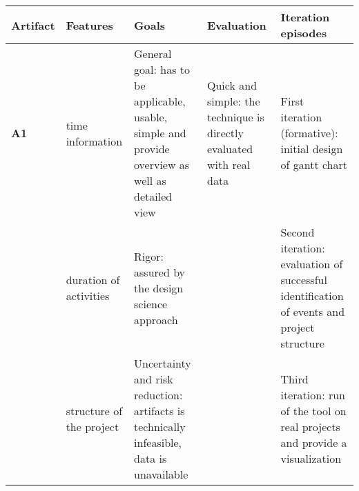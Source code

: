 \begin{longtable}[c]{@{}p{1.2cm}p{2.5cm}p{5cm}p{3cm}p{4cm}@{}}
\toprule
\textbf{Artifact} & \textbf{Features}                              & \textbf{Goals}                                                                                                                                                                                                                                                           & \textbf{Evaluation}                                                                                                                                  & \textbf{Iteration episodes}                                                                                                   \\* \midrule
\endhead
%
\bottomrule
\endfoot
%
\endlastfoot
%
\textbf{A1}       & time information                               & General goal: has to be applicable, usable, simple and provide overview as well as detailed view                                                                                                                                                                         & Quick and simple: the technique is directly evaluated with real data                                                                                 & First iteration (formative): initial design of gantt chart                                                                    \\
                  & duration of activities                         & Rigor: assured by the design science approach                                                                                                                                                                                                                            &                                                                                                                                                      & Second iteration: evaluation of successful identification of events and project structure                                     \\
                  & structure of the project                       & Uncertainty and risk reduction: artifacts is technically infeasible, data is unavailable                                                                                                                                                                                 &                                                                                                                                                      & Third iteration: run of the tool on real projects and provide a visualization                                                 \\

\end{longtable}
